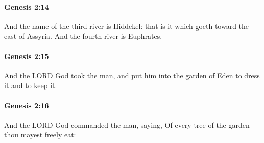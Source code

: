 		\paragraph{Genesis 2:14} %
			\label{GENESIS-2-14}

			And the name of the third river is Hiddekel: that is it which goeth toward the east of Assyria.  And the fourth river is Euphrates.


		\paragraph{Genesis 2:15} %
			\label{GENESIS-2-15}

			And the LORD God took the man, and put him into the garden of Eden to dress it and to keep it.


		\paragraph{Genesis 2:16} %
			\label{GENESIS-2-16}

			And the LORD God commanded the man, saying, Of every tree of the garden thou mayest freely eat:



